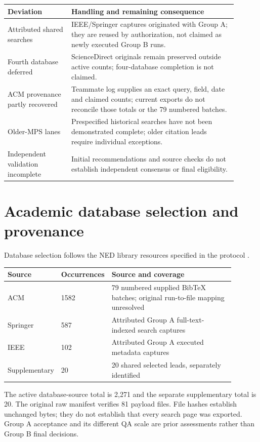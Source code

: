 \documentclass[12pt,a4paper]{article}
\begin{document}
\begin{longtable}{p{0.25\linewidth}p{0.65\linewidth}}
\toprule
Deviation & Handling and remaining consequence\\\midrule
\endhead
Attributed shared searches & IEEE/\allowbreak{}Springer captures originated with Group A; they are reused by authorization, not claimed as newly executed Group B runs.\\
Fourth database deferred & ScienceDirect originals remain preserved outside active counts; four-database completion is not claimed.\\
ACM provenance partly recovered & Teammate log supplies an exact query, field, date and claimed counts; current exports do not reconcile those totals or the 79 numbered batches.\\
Older-MPS lanes & Prespecified historical searches have not been demonstrated complete; older citation leads require individual exceptions.\\
Independent validation incomplete & Initial recommendations and source checks do not establish independent consensus or final eligibility.\\
\bottomrule
\end{longtable}

\section{Academic database selection and provenance}
Database selection follows the NED library resources specified in the protocol \cite{nedResources,nedGuide}.
\begin{longtable}{p{0.16\linewidth}p{0.13\linewidth}p{0.6\linewidth}}
\toprule
Source & Occurrences & Source and coverage\\\midrule
\endhead
ACM & 1582 & 79 numbered supplied BibTeX batches; original run-to-file mapping unresolved\\
Springer & 587 & Attributed Group A full-text-indexed search captures\\
IEEE & 102 & Attributed Group A executed metadata captures\\
Supplementary & 20 & 20 shared selected leads, separately identified\\
\bottomrule
\end{longtable}

The active database-source total is 2,271 and the separate supplementary total is 20. The original raw manifest verifies 81 payload files. File hashes establish unchanged bytes; they do not establish that every search page was exported. Group A acceptance and its different QA scale are prior assessments rather than Group B final decisions.
\end{document}
